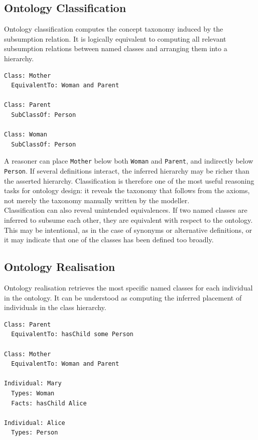 \documentclass{scrbook}
\begin{document}
	\subsection{Ontology Classification}
	
	Ontology classification computes the concept taxonomy induced by the subsumption relation. It is logically equivalent to computing all relevant subsumption relations between named classes and arranging them into a hierarchy.
	
	\begin{lstlisting}
Class: Mother
  EquivalentTo: Woman and Parent

Class: Parent
  SubClassOf: Person

Class: Woman
  SubClassOf: Person
	\end{lstlisting}
	
	A reasoner can place \texttt{Mother} below both \texttt{Woman} and \texttt{Parent}, and indirectly below \texttt{Person}. If several definitions interact, the inferred hierarchy may be richer than the asserted hierarchy. Classification is therefore one of the most useful reasoning tasks for ontology design: it reveals the taxonomy that follows from the axioms, not merely the taxonomy manually written by the modeller.\\
	
	Classification can also reveal unintended equivalences. If two named classes are inferred to subsume each other, they are equivalent with respect to the ontology. This may be intentional, as in the case of synonyms or alternative definitions, or it may indicate that one of the classes has been defined too broadly.
	
	\subsection{Ontology Realisation}
	
	Ontology realisation retrieves the most specific named classes for each individual in the ontology. It can be understood as computing the inferred placement of individuals in the class hierarchy.
	
	\begin{lstlisting}
Class: Parent
  EquivalentTo: hasChild some Person

Class: Mother
  EquivalentTo: Woman and Parent

Individual: Mary
  Types: Woman
  Facts: hasChild Alice

Individual: Alice
  Types: Person
	\end{lstlisting}
	
\end{document}
